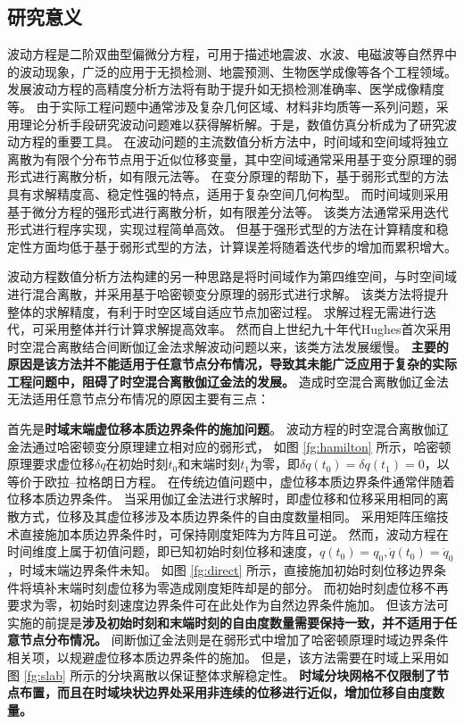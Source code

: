
\subsection{研究意义}
波动方程是二阶双曲型偏微分方程\cite{bedford1994}，可用于描述地震波、水波、电磁波等自然界中的波动现象，广泛的应用于无损检测、地震预测、生物医学成像等各个工程领域。
发展波动方程的高精度分析方法将有助于提升如无损检测准确率、医学成像精度等。
由于实际工程问题中通常涉及复杂几何区域、材料非均质等一系列问题，采用理论分析手段研究波动问题难以获得解析解。于是，数值仿真分析成为了研究波动方程的重要工具。
在波动问题的主流数值分析方法中，时间域和空间域将独立离散为有限个分布节点用于近似位移变量，其中空间域通常采用基于变分原理的弱形式进行离散分析，如有限元法等。
在变分原理的帮助下，基于弱形式型的方法具有求解精度高、稳定性强的特点，适用于复杂空间几何构型。
而时间域则采用基于微分方程的强形式进行离散分析，如有限差分法等。
该类方法通常采用迭代形式进行程序实现，实现过程简单高效。
但基于强形式型的方法在计算精度和稳定性方面均低于基于弱形式型的方法，计算误差将随着迭代步的增加而累积增大。

波动方程数值分析方法构建的另一种思路是将时间域作为第四维空间，与时空间域进行混合离散，并采用基于哈密顿变分原理的弱形式进行求解。
该类方法将提升整体的求解精度，有利于时空区域自适应节点加密过程。
求解过程无需进行迭代，可采用整体并行计算求解提高效率。
然而自上世纪九十年代Hughes首次采用时空混合离散结合间断伽辽金法求解波动问题\cite{hughes1988}以来，该类方法发展缓慢。
\textbf{
主要的原因是该方法并不能适用于任意节点分布情况，导致其未能广泛应用于复杂的实际工程问题中，阻碍了时空混合离散伽辽金法的发展。
}
造成时空混合离散伽辽金法无法适用任意节点分布情况的原因主要有三点：

首先是\textbf{时域末端虚位移本质边界条件的施加问题}。
波动方程的时空混合离散伽辽金法通过哈密顿变分原理建立相对应的弱形式，
如图 \ref{fg:hamilton} 所示，哈密顿原理要求虚位移$\delta q$在初始时刻$t_0$和末端时刻$t_1$为零，即$\delta q(t_0)=\delta q(t_1)=0$，以等价于欧拉--拉格朗日方程\cite{arnold1978}。
在传统边值问题中，虚位移本质边界条件通常伴随着位移本质边界条件。
当采用伽辽金法进行求解时，即虚位移和位移采用相同的离散方式，位移及其虚位移涉及本质边界条件的自由度数量相同。
采用矩阵压缩技术直接施加本质边界条件时，可保持刚度矩阵为方阵且可逆。
然而，波动方程在时间维度上属于初值问题，即已知初始时刻位移和速度，$q(t_0)=q_0,\dot q(t_0) = \dot q_0$，时域末端边界条件未知。
如图 \ref{fg:direct} 所示，直接施加初始时刻位移边界条件将填补末端时刻虚位移为零造成刚度矩阵却是的部分。
而初始时刻虚位移不再要求为零，初始时刻速度边界条件可在此处作为自然边界条件施加。
但该方法可实施的前提是\textbf{涉及初始时刻和末端时刻的自由度数量需要保持一致，并不适用于任意节点分布情况。}
间断伽辽金法则是在弱形式中增加了哈密顿原理时域边界条件相关项，以规避虚位移本质边界条件的施加。
但是，该方法需要在时域上采用如图 \ref{fg:slab} 所示的分块离散以保证整体求解稳定性。
\textbf{时域分块网格不仅限制了节点布置，而且在时域块状边界处采用非连续的位移进行近似，增加位移自由度数量。}


